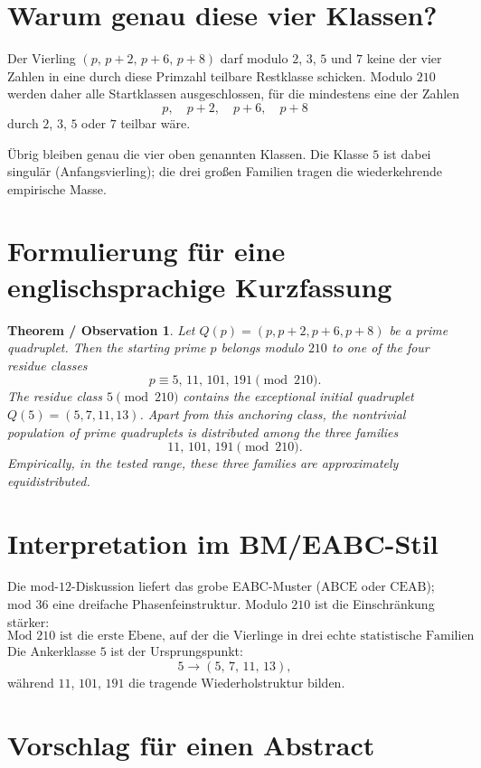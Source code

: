 \documentclass[11pt,a4paper]{article}
\newtheorem*{observation}{Theorem / Observation}
\begin{document}
\section{Warum genau diese vier Klassen?}

Der Vierling $(p,\, p{+}2,\, p{+}6,\, p{+}8)$ darf modulo $2$, $3$, $5$ und $7$ keine der vier Zahlen in eine durch diese Primzahl teilbare Restklasse schicken. Modulo $210$ werden daher alle Startklassen ausgeschlossen, für die mindestens eine der Zahlen
\[
  p,\quad p+2,\quad p+6,\quad p+8
\]
durch $2$, $3$, $5$ oder $7$ teilbar wäre.

Übrig bleiben genau die vier oben genannten Klassen. Die Klasse $5$ ist dabei singulär (Anfangsvierling); die drei großen Familien tragen die wiederkehrende empirische Masse.

\section{Formulierung für eine englischsprachige Kurzfassung}

\begin{observation}
Let $Q(p) = (p, p+2, p+6, p+8)$ be a prime quadruplet. Then the starting prime $p$ belongs modulo $210$ to one of the four residue classes
\[
  p \equiv 5,\, 11,\, 101,\, 191 \pmod{210}.
\]
The residue class $5 \pmod{210}$ contains the exceptional initial quadruplet $Q(5) = (5,7,11,13)$. Apart from this anchoring class, the nontrivial population of prime quadruplets is distributed among the three families
\[
  \boxed{11,\, 101,\, 191 \pmod{210}.}
\]
Empirically, in the tested range, these three families are approximately equidistributed.
\end{observation}

\section{Interpretation im BM/EABC-Stil}

Die mod-$12$-Diskussion liefert das grobe EABC-Muster ($\mathrm{ABCE}$ oder $\mathrm{CEAB}$); mod $36$ eine dreifache Phasenfeinstruktur. Modulo $210$ ist die Einschränkung stärker:
\[
  \boxed{\text{Mod } 210 \text{ ist die erste Ebene, auf der die Vierlinge in drei echte statistische Familien zerfallen.}}
\]
Die Ankerklasse $5$ ist der Ursprungspunkt:
\[
  5 \longrightarrow (5,\, 7,\, 11,\, 13),
\]
während $11$, $101$, $191$ die tragende Wiederholstruktur bilden.

\section{Vorschlag für einen Abstract}
\end{document}
